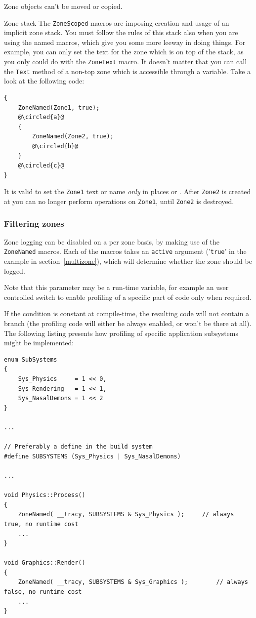 \documentclass[hidelinks,titlepage,a4paper]{article}
\newcommand*\circled[1]{\tikz[baseline=(char.base)]{
    \node[shape=circle,draw,inner sep=1.5pt] (char) {#1};}}
\begin{document}
Zone objects can't be moved or copied.

\begin{bclogo}[
noborder=true,
couleur=black!5,
logo=\bcattention
]{Zone stack}
The \texttt{ZoneScoped} macros are imposing creation and usage of an implicit zone stack. You must follow the rules of this stack also when you are using the named macros, which give you some more leeway in doing things. For example, you can only set the text for the zone which is on top of the stack, as you only could do with the \texttt{ZoneText} macro. It doesn't matter that you can call the \texttt{Text} method of a non-top zone which is accessible through a variable. Take a look at the following code:

\begin{lstlisting}
{
	ZoneNamed(Zone1, true);
	@\circled{a}@
	{
		ZoneNamed(Zone2, true);
		@\circled{b}@
	}
	@\circled{c}@
}
\end{lstlisting}

It is valid to set the \texttt{Zone1} text or name \emph{only} in places \circled{a} or \circled{c}. After \texttt{Zone2} is created at \circled{b} you can no longer perform operations on \texttt{Zone1}, until \texttt{Zone2} is destroyed.

\end{bclogo}

\subsubsection{Filtering zones}
\label{filteringzones}

Zone logging can be disabled on a per zone basis, by making use of the \texttt{ZoneNamed} macros. Each of the macros takes an \texttt{active} argument ('\texttt{true}' in the example in section~\ref{multizone}), which will determine whether the zone should be logged.

Note that this parameter may be a run-time variable, for example an user controlled switch to enable profiling of a specific part of code only when required.

If the condition is constant at compile-time, the resulting code will not contain a branch (the profiling code will either be always enabled, or won't be there at all). The following listing presents how profiling of specific application subsystems might be implemented:

\begin{lstlisting}
enum SubSystems
{
	Sys_Physics		= 1 << 0,
	Sys_Rendering	= 1 << 1,
	Sys_NasalDemons	= 1 << 2
}

...

// Preferably a define in the build system
#define SUBSYSTEMS (Sys_Physics | Sys_NasalDemons)

...

void Physics::Process()
{
	ZoneNamed( __tracy, SUBSYSTEMS & Sys_Physics );		// always true, no runtime cost
	...
}

void Graphics::Render()
{
	ZoneNamed( __tracy, SUBSYSTEMS & Sys_Graphics );		// always false, no runtime cost
	...
}
\end{lstlisting}
\end{document}
